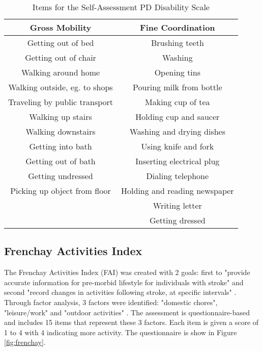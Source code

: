 \begin{table}[ht]
    \centering
    \caption{Items for the Self-Assessment PD Disability Scale \cite{brown_accuracy_1989}}
    \label{tab:SAPDDS}
    \begin{tabular}[pos]{ c c }
        \hline
        \textbf{Gross Mobility} & \textbf{Fine Coordination} \\
        \hline
        Getting out of bed & Brushing teeth \\
        Getting out of chair & Washing \\
        Walking around home & Opening tins \\
        Walking outside, eg. to shops & Pouring milk from bottle \\
        Traveling by public transport & Making cup of tea \\
        Walking up stairs & Holding cup and saucer \\
        Walking downstairs & Washing and drying dishes \\
        Getting into bath & Using knife and fork \\
        Getting out of bath & Inserting electrical plug \\
        Getting undressed & Dialing telephone \\
        Picking up object from floor & Holding and reading newspaper \\
        & Writing letter \\
        & Getting dressed \\
        \hline 
    \end{tabular}
\end{table}


\clearpage
\subsection{Frenchay Activities Index}
The Frenchay Activities Index (FAI) was created with 2 goals: first to "provide accurate information for pre-morbid lifestyle for individuals with stroke" and second "record changes in activities following stroke, at specific intervals" \cite{holbrook_activities_1983}. Through factor analysis, 3 factors were identified: "domestic chores", "leisure/work" and "outdoor activities" \cite{holbrook_activities_1983}. The assessment is questionnaire-based and includes 15 items that represent these 3 factors. Each item is given a score of 1 to 4 with 4 indicating more activity. The questionnaire is show in Figure \ref{fig:frenchay}.

